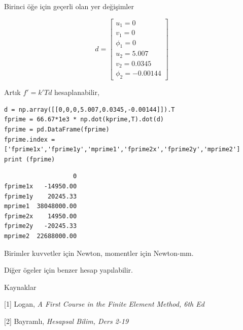 \documentclass[12pt,fleqn]{article}\usepackage{../../common}
\begin{document}
Birinci öğe için geçerli olan yer değişimler

$$
d = \left[\begin{array}{c}
u_1 = 0 \\ v_1 = 0 \\ \phi_1 = 0 \\ u_2 = 5.007 \\ v_2 = 0.0345 \\ \phi_2 = -0.00144
\end{array}\right]
$$

Artık $f' = k' T d$ hesaplanabilir,

\begin{verbatim}
d = np.array([[0,0,0,5.007,0.0345,-0.00144]]).T
fprime = 66.67*1e3 * np.dot(kprime,T).dot(d)
fprime = pd.DataFrame(fprime)
fprime.index = ['fprime1x','fprime1y','mprime1','fprime2x','fprime2y','mprime2']
print (fprime)
\end{verbatim}

\begin{verbatim}
                   0
fprime1x   -14950.00
fprime1y    20245.33
mprime1  38048000.00
fprime2x    14950.00
fprime2y   -20245.33
mprime2  22688000.00
\end{verbatim}

Birimler kuvvetler için Newton, momentler için Newton-mm.

Diğer ögeler için benzer hesap yapılabilir.

Kaynaklar

[1] Logan, {\em A First Course in the Finite Element Method, 6th Ed}

[2] Bayramlı, {\em Hesapsal Bilim, Ders 2-19}
\end{document}

